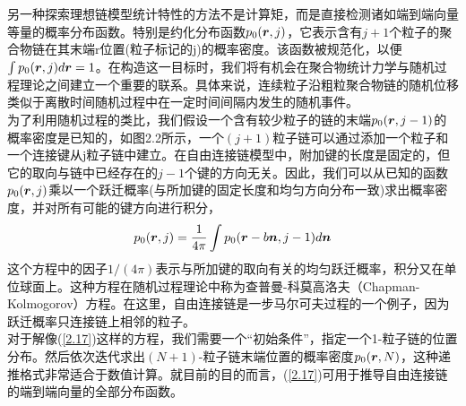 另一种探索理想链模型统计特性的方法不是计算矩，而是直接检测诸如端到端向量等量的概率分布函数。特别是约化分布函数$p_{0}(\bm{r},j)$，它表示含有$j+1$个粒子的聚合物链在其末端r位置(粒子标记的j)的概率密度。该函数被规范化，以便$\int p_0(\bm{r},j)d\bm{r}=1$。在构造这一目标时，我们将有机会在聚合物统计力学与随机过程理论之间建立一个重要的联系。具体来说，连续粒子沿粗粒聚合物链的随机位移类似于离散时间随机过程中在一定时间间隔内发生的随机事件。\\

为了利用随机过程的类比，我们假设一个含有较少粒子的链的末端$p_{0}(\bm{r},j-1)$的概率密度是已知的，如图2.2所示，一个$(j+1)$粒子链可以通过添加一个粒子和一个连接键从j粒子链中建立。在自由连接链模型中，附加键的长度是固定的，但它的取向与链中已经存在的$j−1$个键的方向无关。因此，我们可以从已知的函数$p_{0}(\bm{r},j)$乘以一个跃迁概率(与所加键的固定长度和均匀方向分布一致)求出概率密度，并对所有可能的键方向进行积分，\\
\begin{equation}
p_{0}(\bm{r},j)=\frac{1}{4 \pi} \int p_0(\bm{r}-b \bm{n},j-1)d\bm{n}
\label{2.17}
\end{equation}
这个方程中的因子$1/(4 \pi)$表示与所加键的取向有关的均匀跃迁概率，积分又在单位球面上。这种方程在随机过程理论中称为查普曼-科莫高洛夫（Chapman-Kolmogorov）方程。在这里，自由连接链是一步马尔可夫过程的一个例子，因为跃迁概率只连接链上相邻的粒子。\\

对于解像(\ref{2.17})这样的方程，我们需要一个“初始条件”，指定一个1-粒子链的位置分布。然后依次迭代求出$(N+1)$-粒子链末端位置的概率密度$p_{0}(\bm{r},N)$，这种递推格式非常适合于数值计算。就目前的目的而言，(\ref{2.17})可用于推导自由连接链的端到端向量的全部分布函数。\\

